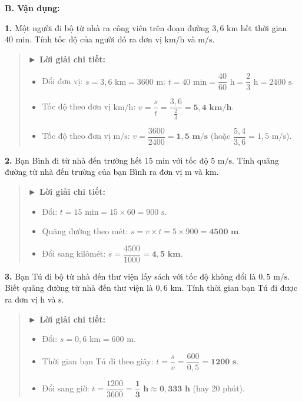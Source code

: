 \documentclass[11pt,a4paper]{article}
\begin{document}
\vspace{4pt}
{\color{mySub}\textbf{B. Vận dụng:}}

\textbf{1.} Một người đi bộ từ nhà ra công viên trên đoạn đường $3{,}6\text{ km}$ hết thời gian $40\text{ min}$. Tính tốc độ của người đó ra đơn vị $\text{km/h}$ và $\text{m/s}$.

\begin{quote}\small
{\color{myBlue}\textbf{► Lời giải chi tiết:}}
\begin{itemize}[leftmargin=*,itemsep=1pt,topsep=1pt]
  \item Đổi đơn vị: $s = 3{,}6\text{ km} = 3600\text{ m}$; $t = 40\text{ min} = \dfrac{40}{60}\text{ h} = \dfrac{2}{3}\text{ h} = 2400\text{ s}$.
  \item Tốc độ theo đơn vị $\text{km/h}$: $v = \dfrac{s}{t} = \dfrac{3{,}6}{\frac{2}{3}} = \mathbf{5{,}4\text{ km/h}}$.
  \item Tốc độ theo đơn vị $\text{m/s}$: $v = \dfrac{3600}{2400} = \mathbf{1{,}5\text{ m/s}}$ (hoặc $\dfrac{5{,}4}{3{,}6} = 1{,}5\text{ m/s}$).
\end{itemize}
\end{quote}

\textbf{2.} Bạn Bình đi từ nhà đến trường hết $15\text{ min}$ với tốc độ $5\text{ m/s}$. Tính quãng đường từ nhà đến trường của bạn Bình ra đơn vị $\text{m}$ và $\text{km}$.

\begin{quote}\small
{\color{myBlue}\textbf{► Lời giải chi tiết:}}
\begin{itemize}[leftmargin=*,itemsep=1pt,topsep=1pt]
  \item Đổi: $t = 15\text{ min} = 15 \times 60 = 900\text{ s}$.
  \item Quãng đường theo mét: $s = v \times t = 5 \times 900 = \mathbf{4500\text{ m}}$.
  \item Đổi sang kilômét: $s = \dfrac{4500}{1000} = \mathbf{4{,}5\text{ km}}$.
\end{itemize}
\end{quote}

\textbf{3.} Bạn Tú đi bộ từ nhà đến thư viện lấy sách với tốc độ không đổi là $0{,}5\text{ m/s}$. Biết quãng đường từ nhà đến thư viện là $0{,}6\text{ km}$. Tính thời gian bạn Tú đi được ra đơn vị $\text{h}$ và $\text{s}$.

\begin{quote}\small
{\color{myBlue}\textbf{► Lời giải chi tiết:}}
\begin{itemize}[leftmargin=*,itemsep=1pt,topsep=1pt]
  \item Đổi: $s = 0{,}6\text{ km} = 600\text{ m}$.
  \item Thời gian bạn Tú đi theo giây: $t = \dfrac{s}{v} = \dfrac{600}{0{,}5} = \mathbf{1200\text{ s}}$.
  \item Đổi sang giờ: $t = \dfrac{1200}{3600} = \mathbf{\dfrac{1}{3}\text{ h}} \approx \mathbf{0{,}333\text{ h}}$ (hay 20 phút).
\end{itemize}
\end{quote}
\end{document}
